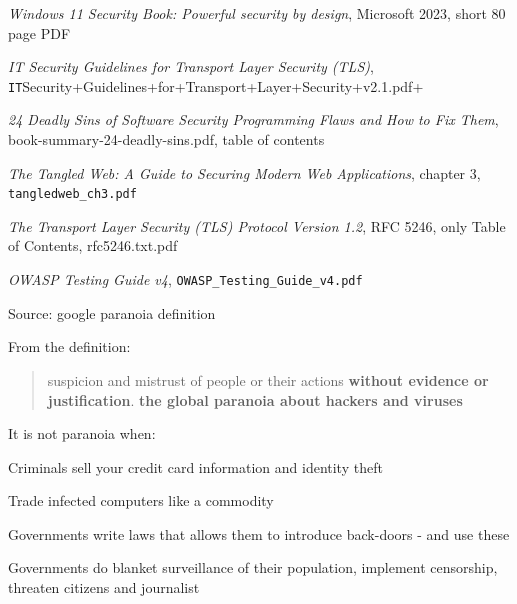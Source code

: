 \documentclass[Screen16to9,17pt]{foils}
\begin{document}
\begin{list2}
\item \emph{Windows 11 Security Book: Powerful security by design}, Microsoft 2023, short 80 page PDF\\ {\scriptsize{}}
\item \emph{IT Security Guidelines for Transport Layer Security (TLS)},\\ \verb+IT+Security+Guidelines+for+Transport+Layer+Security+v2.1.pdf+
\item \emph{24 Deadly Sins of Software Security Programming Flaws and How to Fix Them},\\
book-summary-24-deadly-sins.pdf, table of contents
\item \emph{The Tangled Web: A Guide to Securing Modern Web Applications}, chapter 3, \verb+tangledweb_ch3.pdf+
\item \emph{The Transport Layer Security (TLS) Protocol
Version 1.2}, RFC 5246, only Table of Contents, rfc5246.txt.pdf
\item \emph{OWASP Testing Guide v4}, \verb+OWASP_Testing_Guide_v4.pdf+
\end{list2}





Source: google paranoia definition


From the definition:
\begin{quote}
suspicion and mistrust of people or their actions {\bf without evidence or justification}.
{\bf the global paranoia about hackers and viruses}
\end{quote}

\begin{list1}
\item It is not paranoia when:
\begin{list2}
\item Criminals sell your credit card information and identity theft
\item Trade infected computers like a commodity
\item Governments write laws that allows them to introduce back-doors - and use these
\item Governments do blanket surveillance of their population, implement censorship, threaten citizens and journalist
\end{list2}
\end{list1}
\end{document}
